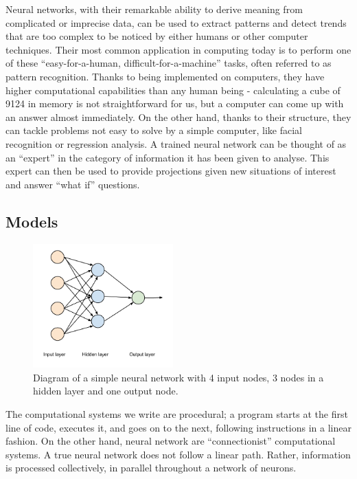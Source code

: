 Neural networks, with their remarkable ability to derive meaning from complicated or imprecise data, can be used to extract patterns and detect trends that are too complex to be noticed by either humans or other computer techniques. Their most common application in computing today is to perform one of these ``easy-for-a-human, difficult-for-a-machine'' tasks, often referred to as pattern recognition. Thanks to being implemented on computers, they have higher computational capabilities than any human being - calculating a cube of 9124 in memory is not straightforward for us, but a computer can come up with an answer almost immediately. On the other hand, thanks to their structure, they can tackle problems not easy to solve by a simple computer, like facial recognition or regression analysis.
A trained neural network can be thought of as an ``expert'' in the category of information it has been given to analyse. This expert can then be used to provide projections given new situations of interest and answer ``what if'' questions.

\vspace{10pt}

\subsection{Models}

\begin{figure}
  \vspace{-30pt}

  \begin{center}
    \includegraphics[width=0.48\textwidth]{Figures/simpleANN}
  \end{center}
  \caption{Diagram of a simple neural network with 4 input nodes, 3 nodes in a hidden layer and one output node.}
  \label{fig:examplennn}
\end{figure}

The computational systems we write are procedural; a program starts at the first line of code, executes it, and goes on to the next, following instructions in a linear fashion.
On the other hand, neural network are ``connectionist'' computational systems. A true neural network does not follow a linear path. Rather, information is processed collectively, in parallel throughout a network of neurons.

